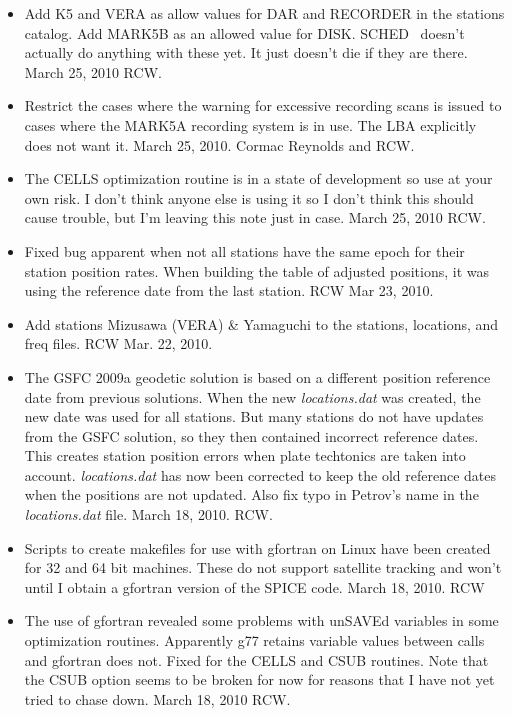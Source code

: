 \documentclass{report}
\newcommand{\schedb}{{\sc SCHED~}}
\begin{document}
\begin{itemize}

\item Add K5 and VERA as allow values for DAR and RECORDER in the
stations catalog.  Add MARK5B as an allowed value for DISK.  \schedb
doesn't actually do anything with these yet.  It just doesn't die
if they are there.  March 25, 2010  RCW.

\item Restrict the cases where the warning for excessive recording
scans is issued to cases where the MARK5A recording system is in use.
The LBA explicitly does not want it.  March 25, 2010.  Cormac Reynolds
and RCW.

\item The CELLS optimization routine is in a state of development so
use at your own risk.  I don't think anyone else is using it so I don't
think this should cause trouble, but I'm leaving this note just in case.
March 25, 2010  RCW.

\item Fixed bug apparent when not all stations have the same epoch for
their station position rates.  When building the table of adjusted positions,
it was using the reference date from the last station.  RCW Mar 23, 2010.

\item Add stations Mizusawa (VERA) \& Yamaguchi to the stations, locations,
and freq files.  RCW Mar. 22, 2010.

\item The GSFC 2009a geodetic solution is based on a different
position reference date from previous solutions.  When the new {\sl
locations.dat} was created, the new date was used for all stations.
But many stations do not have updates from the GSFC solution, so they
then contained incorrect reference dates.  This creates station
position errors when plate techtonics are taken into account.  {\sl
locations.dat} has now been corrected to keep the old reference dates
when the positions are not updated. Also fix typo in Petrov's name in the
{\sl locations.dat} file.  March 18, 2010.  RCW.

\item Scripts to create makefiles for use with gfortran on Linux have
been created for 32 and 64 bit machines.  These do not support satellite
tracking and won't until I obtain a gfortran version of the SPICE code.
March 18, 2010.  RCW

\item The use of gfortran revealed some problems with unSAVEd variables
in some optimization routines.  Apparently g77 retains variable values
between calls and gfortran does not.  Fixed for the CELLS and CSUB
routines.  Note that the CSUB option seems to be broken for now for
reasons that I have not yet tried to chase down.
March 18, 2010  RCW.

\end{itemize}
\end{document}
